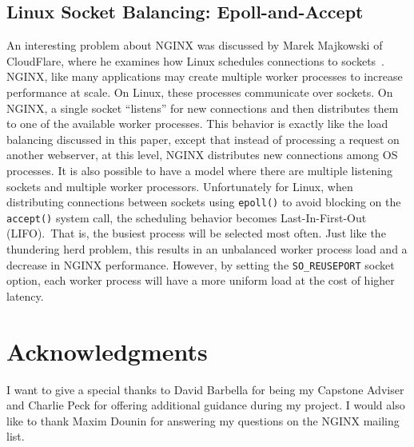 \subsection{Linux Socket Balancing: Epoll-and-Accept}
An interesting problem about NGINX was discussed by Marek Majkowski of
CloudFlare, where he examines how Linux schedules connections to
sockets~\cite{epoll}. NGINX, like many applications may create
multiple worker processes to increase performance at scale. On Linux,
these processes communicate over sockets. On NGINX, a single socket
``listens'' for new connections and then distributes them to one of
the available worker processes. This behavior is exactly like the load
balancing discussed in this paper, except that instead of processing a
request on another webserver, at this level, NGINX distributes new
connections among OS processes. It is also possible to have a model
where there are multiple listening sockets and multiple worker
processors. Unfortunately for Linux, when distributing connections
between sockets using \texttt{epoll()} to avoid blocking on the
\texttt{accept()} system call, the scheduling behavior becomes
Last-In-First-Out (LIFO).\ That is, the busiest process will be
selected most often. Just like the thundering herd problem, this
results in an unbalanced worker process load and a decrease in NGINX
performance. However, by setting the \texttt{SO_REUSEPORT} socket
option, each worker process will have a more uniform load at the cost
of higher latency.

\section{Acknowledgments}
I want to give a special thanks to David Barbella for being my
Capstone Adviser and Charlie Peck for offering additional guidance
during my project. I would also like to thank Maxim Dounin for
answering my questions on the NGINX mailing list.

